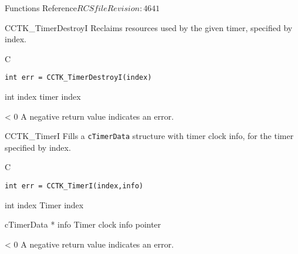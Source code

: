 \begin{cactuspart}{ Functions Reference}{$RCSfile$}{$Revision: 4641 $}
\begin{FunctionDescription}{CCTK\_TimerDestroyI}
\label{CCTK-TimerDestroyI}
Reclaims resources used by the
given timer, specified by index.
\begin{SynopsisSection}
\begin{Synopsis}{C}
\begin{verbatim}
int err = CCTK_TimerDestroyI(index)
\end{verbatim}
\end{Synopsis}
\end{SynopsisSection}

\begin{ParameterSection}
\begin{Parameter} {int index}
timer index
\end{Parameter}
\end{ParameterSection}

\begin{ErrorSection}
\begin{Error}{< 0}
A negative return value indicates an error.
\end{Error}
\end{ErrorSection}
\end{FunctionDescription}


\begin{FunctionDescription}{CCTK\_TimerI}
\label{CCTK-TimerI}
Fills a {\tt cTimerData}
structure with timer clock info, for the timer specified by index.
\begin{SynopsisSection}
\begin{Synopsis}{C}
\begin{verbatim}
int err = CCTK_TimerI(index,info)
\end{verbatim}
\end{Synopsis}
\end{SynopsisSection}

\begin{ParameterSection}
\begin{Parameter} {int index}
Timer index
\end{Parameter}

\begin{Parameter} {cTimerData * info}
Timer clock info pointer
\end{Parameter}
\end{ParameterSection}

\begin{ErrorSection}
\begin{Error}{< 0}
A negative return value indicates an error.
\end{Error}
\end{ErrorSection}
\end{FunctionDescription}


\end{cactuspart}
